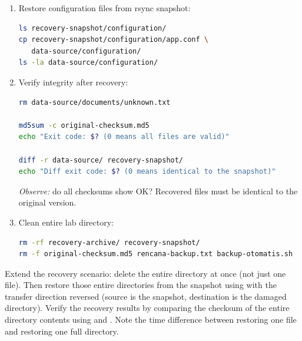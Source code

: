 \begin{enumerate}
\begin{lstlisting}[language=bash, caption={Restore from tar archive to temporary directory}]
mkdir -p /tmp/restore-lap14
tar -xzf recovery-archive/full-backup.tar.gz \
    -C /tmp/restore-lap14 \
    data-source/documents/report.txt

ls /tmp/restore-lap14/data-source/documents/
cp /tmp/restore-lap14/data-source/documents/report.txt \
   data-source/documents/

rm -rf /tmp/restore-lap14
\end{lstlisting}

\item Restore configuration files from rsync snapshot:
\begin{lstlisting}[language=bash, caption={Restore from rsync snapshot}]
ls recovery-snapshot/configuration/
cp recovery-snapshot/configuration/app.conf \
   data-source/configuration/
ls -la data-source/configuration/
\end{lstlisting}

\item Verify integrity after recovery:
\begin{lstlisting}[language=bash, caption={Checksum verification after recovery}]
rm data-source/documents/unknown.txt

md5sum -c original-checksum.md5
echo "Exit code: $? (0 means all files are valid)"

diff -r data-source/ recovery-snapshot/
echo "Diff exit code: $? (0 means identical to the snapshot)"
\end{lstlisting}
\textit{Observe:} do all checksums show OK? Recovered files
must be identical to the original version.

\item Clean entire lab directory:
\begin{lstlisting}[language=bash, caption={Cleaning practice directories}]
rm -rf recovery-archive/ recovery-snapshot/
rm -f original-checksum.md5 rencana-backup.txt backup-otomatis.sh
\end{lstlisting}
\end{enumerate}

\begin{challengebox}
Extend the recovery scenario: delete the entire  directory at once (not just one file). Then restore those entire directories from the snapshot using  with the transfer direction reversed (source is the snapshot, destination is the damaged directory). Verify the recovery results by comparing the checksum of the entire directory contents using  and
\cmd{md5sum}. Note the time difference between restoring one file and restoring one
full directory.
\end{challengebox}

